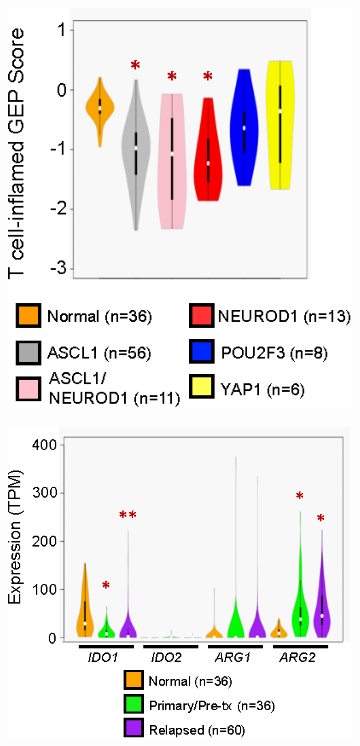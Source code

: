 \begin{figure}[htb]
    \hspace{0.08\textwidth}%
    \begin{subfigure}{0.236\textwidth}
        \includegraphics[width=\linewidth,keepaspectratio]{images/sclc/gep_violin_sclc_subtype}
        \caption{}\label{fig:sclc:gep_violin_sclc_subtype}
    \end{subfigure}%
    \hfill%
    \begin{subfigure}{0.304\textwidth}
        \includegraphics[width=\linewidth,keepaspectratio]{images/sclc/ido_arg_violin}

\end{subfigure}
\end{figure}
